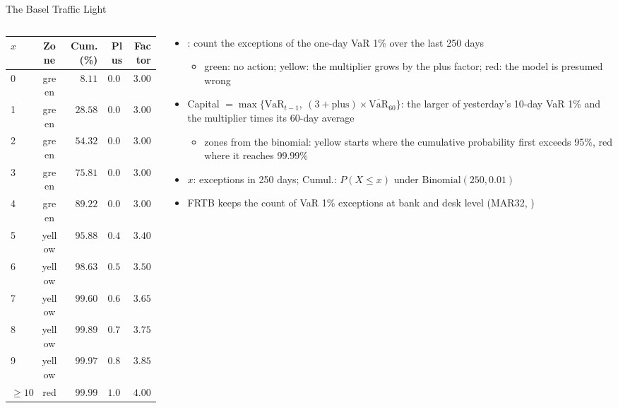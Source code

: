 \begin{frame}{The Basel Traffic Light}
\itemsize{\footnotesize}
\begin{columns}[T]
\begin{column}{0.44\textwidth}
\begin{center}
\scriptsize
\begin{tabular}{lcrrr}
\toprule
$x$ & Zone & Cum.\ (\%) & Plus & Factor \\
\midrule
0 & green & $8.11$ & $0.00$ & $3.00$ \\
1 & green & $28.58$ & $0.00$ & $3.00$ \\
2 & green & $54.32$ & $0.00$ & $3.00$ \\
3 & green & $75.81$ & $0.00$ & $3.00$ \\
4 & green & $89.22$ & $0.00$ & $3.00$ \\
5 & yellow & $95.88$ & $0.40$ & $3.40$ \\
6 & yellow & $98.63$ & $0.50$ & $3.50$ \\
7 & yellow & $99.60$ & $0.65$ & $3.65$ \\
8 & yellow & $99.89$ & $0.75$ & $3.75$ \\
9 & yellow & $99.97$ & $0.85$ & $3.85$ \\
$\ge 10$ & red & $99.99$ & $1.00$ & $4.00$ \\
\bottomrule
\end{tabular}
\end{center}

\end{column}
\begin{column}{0.54\textwidth}
\begin{itemize}
    \item {}: count the exceptions of the one-day VaR 1\% over the last 250 days
    \begin{itemize}
        \item green: no action; yellow: the multiplier grows by the plus factor; red: the model is presumed wrong
    \end{itemize}
    \item Capital $= \max\{\mathrm{VaR}_{t-1},\ (3 + \text{plus}) \times \overline{\mathrm{VaR}}_{60}\}$: the larger of yesterday's 10-day VaR 1\% and the multiplier times its 60-day average
    \begin{itemize}
        \item zones from the binomial: yellow starts where the cumulative probability first exceeds 95\%, red where it reaches 99.99\%
    \end{itemize}
    \item $x$: exceptions in 250 days; Cumul.: $P(X \le x)$ under $\mathrm{Binomial}(250, 0.01)$
    \item FRTB keeps the count of VaR 1\% exceptions at bank and desk level (MAR32, )
\end{itemize}
\end{column}
\end{columns}
\end{frame}

